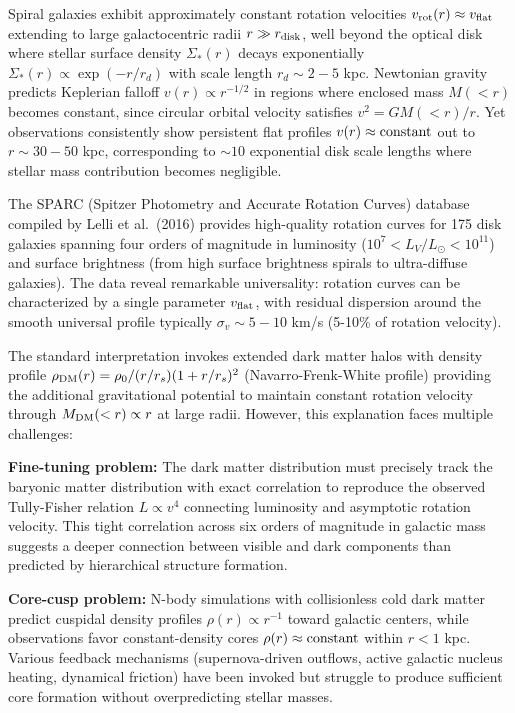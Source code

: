 \documentclass[11pt,a4paper]{article}
\begin{document}
Spiral galaxies exhibit approximately constant rotation velocities
\(v_{\rm rot}(r) \approx v_{\rm flat}\) extending to large
galactocentric radii \(r \gg r_{\rm disk}\), well beyond the optical
disk where stellar surface density \(\Sigma_*(r)\) decays exponentially
\(\Sigma_*(r) \propto \exp(-r/r_d)\) with scale length \(r_d \sim 2-5\)
kpc. Newtonian gravity predicts Keplerian falloff
\(v(r) \propto r^{-1/2}\) in regions where enclosed mass \(M(<r)\)
becomes constant, since circular orbital velocity satisfies
\(v^2 = GM(<r)/r\). Yet observations consistently show persistent flat
profiles \(v(r) \approx {\rm constant}\) out to \(r \sim 30-50\) kpc,
corresponding to \(\sim 10\) exponential disk scale lengths where
stellar mass contribution becomes negligible.

The SPARC (Spitzer Photometry and Accurate Rotation Curves) database
compiled by Lelli et al.~(2016) provides high-quality rotation curves
for 175 disk galaxies spanning four orders of magnitude in luminosity
(\(10^7 < L_V/L_\odot < 10^{11}\)) and surface brightness (from high
surface brightness spirals to ultra-diffuse galaxies). The data reveal
remarkable universality: rotation curves can be characterized by a
single parameter \(v_{\rm flat}\), with residual dispersion around the
smooth universal profile typically \(\sigma_v \sim 5-10\) km/s (5-10\%
of rotation velocity).

The standard interpretation invokes extended dark matter halos with
density profile \(\rho_{\rm DM}(r) = \rho_0/(r/r_s)(1+r/r_s)^2\)
(Navarro-Frenk-White profile) providing the additional gravitational
potential to maintain constant rotation velocity through
\(M_{\rm DM}(<r) \propto r\) at large radii. However, this explanation
faces multiple challenges:

\textbf{Fine-tuning problem:} The dark matter distribution must
precisely track the baryonic matter distribution with exact correlation
to reproduce the observed Tully-Fisher relation \(L \propto v^4\)
connecting luminosity and asymptotic rotation velocity. This tight
correlation across six orders of magnitude in galactic mass suggests a
deeper connection between visible and dark components than predicted by
hierarchical structure formation.

\textbf{Core-cusp problem:} N-body simulations with collisionless cold
dark matter predict cuspidal density profiles \(\rho(r) \propto r^{-1}\)
toward galactic centers, while observations favor constant-density cores
\(\rho(r) \approx {\rm constant}\) within \(r < 1\) kpc. Various
feedback mechanisms (supernova-driven outflows, active galactic nucleus
heating, dynamical friction) have been invoked but struggle to produce
sufficient core formation without overpredicting stellar masses.
\end{document}
